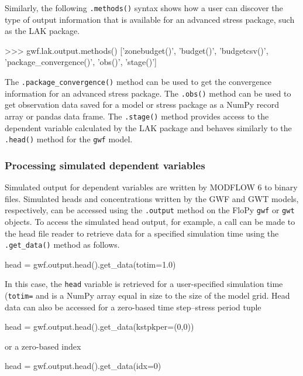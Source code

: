 \documentclass[12pt, oneside]{article}  	%
\begin{document}
Similarly, the following \texttt{.methods()} syntax shows how a user can discover the type of output information that is available for an advanced stress package, such as the LAK package.

\begin{python}
>>> gwf.lak.output.methods()
['zonebudget()', 'budget()', 'budgetcsv()', 'package_convergence()', 'obs()', 
 'stage()']
\end{python}

\noindent The \texttt{.package\_convergence()} method can be used to get the convergence information for an advanced stress package. The \texttt{.obs()} method can be used to get observation data saved for a model or stress package as a NumPy record array or pandas data frame. The \texttt{.stage()} method provides access to the dependent variable calculated by the LAK package and behaves similarly to the \texttt{.head()} method for the \texttt{gwf} model. 

\subsubsection*{Processing simulated dependent variables}

Simulated output for dependent variables are written by MODFLOW 6 to binary files. Simulated heads and concentrations written by the GWF and GWT models, respectively, can be accessed using the \texttt{.output} method on the FloPy \texttt{gwf} or \texttt{gwt} objects. To access the simulated head output, for example, a call can be made to the head file reader to retrieve data for a specified simulation time using the \texttt{.get\_data()} method as follows.

\begin{python}
head = gwf.output.head().get_data(totim=1.0)
\end{python}

\noindent In this case, the \texttt{head} variable is retrieved for a user-specified simulation time (\texttt{totim=} and is a NumPy array equal in size to the size of the model grid. Head data can also be accessed for a zero-based time step--stress period tuple

\begin{python}
head = gwf.output.head().get_data(kstpkper=(0,0))
\end{python}

\noindent or a zero-based index

\begin{python}
head = gwf.output.head().get_data(idx=0)
\end{python}
\end{document}
